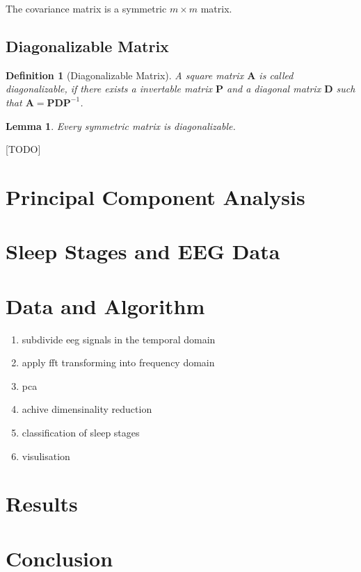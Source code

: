 \documentclass[a4paper]{IEEEtran}
\newtheorem{definition}{Definition}
\newtheorem{lemma}{Lemma}
\begin{document}
The covariance matrix is a symmetric $m\times m$ matrix.

\subsection{Diagonalizable Matrix}

\begin{definition}[Diagonalizable Matrix]
	A square matrix $\mathbf{A}$ is called \textit{diagonalizable}, if there exists a invertable matrix $\mathbf{P}$ and a diagonal matrix $\mathbf{D}$ such that $\mathbf{A} = \mathbf{P}\mathbf{D}\mathbf{P}^{-1}$.
\end{definition}

\begin{lemma}
	Every symmetric matrix is diagonalizable.
\end{lemma}

[TODO]

\section{Principal Component Analysis}
\label{sec:principal_component_analysis}

\section{Sleep Stages and EEG Data}
\label{sec:sleep_stages_and_eeg_data}

\section{Data and Algorithm}
\label{sec:data_and_algorithm}

\begin{enumerate}
	\item subdivide eeg signals in the temporal domain
	\item apply fft transforming into frequency domain
	\item pca
	\item achive dimensinality reduction
	\item classification of sleep stages
	\item visulisation
\end{enumerate}

\section{Results}
\label{sec:results}

\section{Conclusion}
\label{sec:conclusion}



\end{document}
